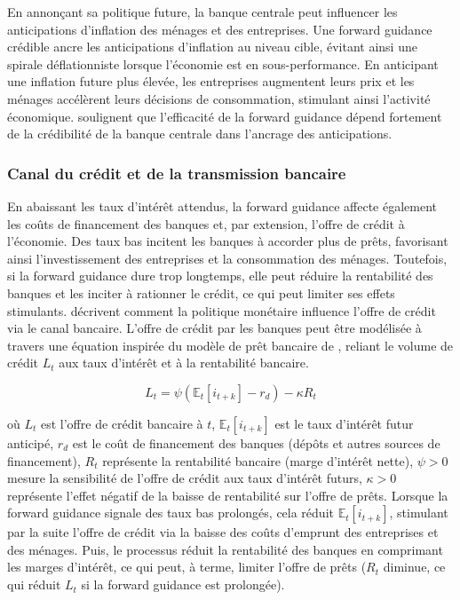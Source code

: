 En annonçant sa politique future, la banque centrale peut influencer les anticipations d'inflation des ménages et des entreprises. Une forward guidance crédible ancre les anticipations d'inflation au niveau cible, évitant ainsi une spirale déflationniste lorsque l'économie est en sous-performance. En anticipant une inflation future plus élevée, les entreprises augmentent leurs prix et les ménages accélèrent leurs décisions de consommation, stimulant ainsi l'activité économique. \citep{coenen2021macroeconomic} soulignent que l'efficacité de la forward guidance dépend fortement de la crédibilité de la banque centrale dans l’ancrage des anticipations.

\subsubsection{Canal du crédit et de la transmission bancaire}

En abaissant les taux d'intérêt attendus, la forward guidance affecte également les coûts de financement des banques et, par extension, l'offre de crédit à l'économie. Des taux bas incitent les banques à accorder plus de prêts, favorisant ainsi l'investissement des entreprises et la consommation des ménages. Toutefois, si la forward guidance dure trop longtemps, elle peut réduire la rentabilité des banques et les inciter à rationner le crédit, ce qui peut limiter ses effets stimulants. \citep{bernanke1995} décrivent comment la politique monétaire influence l'offre de crédit via le canal bancaire. L’offre de crédit par les banques peut être modélisée à travers une équation inspirée du modèle de prêt bancaire de \citep{bernanke1988credit}, reliant le volume de crédit \( L_t \) aux taux d’intérêt et à la rentabilité bancaire.

\begin{equation} L_t = \psi \left( \mathbb{E}_t [i_{t+k}] - r_d \right) - \kappa R_t 
\end{equation}

où \( L_t \) est l’offre de crédit bancaire à \( t \), \( \mathbb{E}_t [i_{t+k}] \) est le taux d’intérêt futur anticipé, \( r_d \) est le coût de financement des banques (dépôts et autres sources de financement), \( R_t \) représente la rentabilité bancaire (marge d’intérêt nette), \( \psi > 0 \) mesure la sensibilité de l’offre de crédit aux taux d’intérêt futurs, \( \kappa > 0 \) représente l’effet négatif de la baisse de rentabilité sur l’offre de prêts. Lorsque la forward guidance signale des taux bas prolongés, cela réduit \( \mathbb{E}_t [i_{t+k}] \), stimulant par la suite l’offre de crédit via la baisse des coûts d’emprunt des entreprises et des ménages. Puis, le processus réduit la rentabilité des banques en comprimant les marges d’intérêt, ce qui peut, à terme, limiter l’offre de prêts (\( R_t \) diminue, ce qui réduit \( L_t \) si la forward guidance est prolongée).

